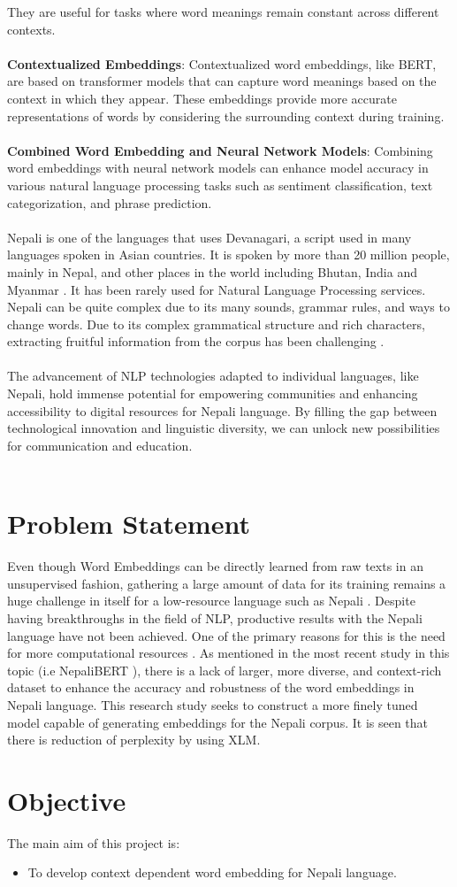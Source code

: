 They are useful for tasks where word meanings remain constant across different contexts.\\\\
\textbf{Contextualized Embeddings}:
Contextualized word embeddings, like BERT, are based on transformer models that can capture word meanings based on the context in which they appear.
These embeddings provide more accurate representations of words by considering the surrounding context during training. \\\\
\textbf{Combined Word Embedding and Neural Network Models}:
Combining word embeddings with neural network models can enhance model accuracy in various natural language processing tasks such as sentiment classification, text categorization, and phrase prediction. \\\\
Nepali is one of the languages that uses Devanagari, a script used in many languages spoken in Asian countries. It is spoken by more than 20 million people, mainly in Nepal, and other places in the world including Bhutan, India and Myanmar \cite{niraula2020linguistic}.  It has been rarely used for Natural Language Processing services.  Nepali can be quite complex due to its many sounds, grammar rules, and ways to change words. Due to its complex grammatical structure and rich characters, extracting fruitful information from the corpus has been challenging \cite{NepaliBERT}.\\\\
The advancement of NLP technologies adapted to individual languages, like Nepali, hold immense potential for empowering communities and enhancing accessibility to digital resources for Nepali language. By filling the gap between technological innovation and linguistic diversity, we can unlock new possibilities for communication and education.\\\\
\section{Problem Statement} 
Even though Word Embeddings can be directly learned from raw texts in an unsupervised fashion, gathering a large amount of data for its training remains a huge challenge in itself for a low-resource language such as Nepali \cite{koirala-niraula-2021-npvec1}. Despite having breakthroughs in the field of NLP, productive results with the Nepali language have not been achieved. One of the primary reasons for this is the need for more computational resources \cite{NepaliBERT}. As mentioned in the most recent study in this topic (i.e NepaliBERT \cite{NepaliBERT}), there is a lack of larger, more diverse, and context-rich dataset to enhance the accuracy and robustness of the word embeddings in Nepali language. This research study seeks to construct a more finely tuned model capable of generating embeddings for the Nepali corpus. It is seen that there is reduction of perplexity by using XLM.
\section{Objective}
    The main aim of this project is:
    \begin{itemize}
        \item To develop context dependent word embedding for Nepali language.
    \end{itemize}
